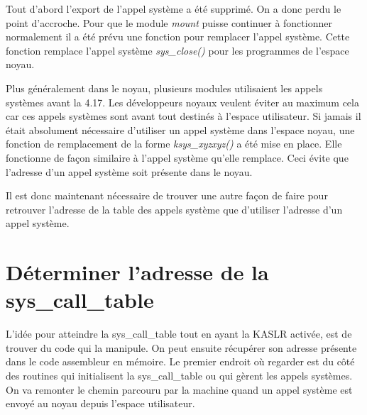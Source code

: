 \documentclass[journal, a4paper]{IEEEtran}
\begin{document}
Tout d'abord l'export de l'appel système a été supprimé. On a donc perdu le point d'accroche. Pour que le module \textit{mount} puisse continuer à fonctionner normalement il a été prévu une fonction pour remplacer l'appel système. Cette fonction remplace l'appel système \textit{sys\_close()} pour les programmes de l'espace noyau.

 Plus généralement dans le noyau, plusieurs modules utilisaient les appels systèmes avant la 4.17. Les développeurs noyaux veulent éviter au maximum cela car ces appels systèmes sont avant tout destinés à l'espace utilisateur. Si jamais il était absolument nécessaire d'utiliser un appel système dans l'espace noyau, une fonction de remplacement de la forme \textit{ksys\_xyzxyz()} a été mise en place. Elle fonctionne de façon similaire à l'appel système qu'elle remplace. Ceci évite que l'adresse d'un appel système soit présente dans le noyau.

Il est donc maintenant nécessaire de trouver une autre façon de faire pour retrouver l'adresse de la table des appels système que d'utiliser l'adresse d'un appel système.

\section{Déterminer l'adresse de la sys\_call\_table}

L'idée pour atteindre la sys\_call\_table tout en ayant la KASLR activée, est de trouver du code qui la manipule. On peut ensuite récupérer son adresse présente dans le code assembleur en mémoire. Le premier endroit où regarder est du côté des routines qui initialisent la sys\_call\_table ou qui gèrent les appels systèmes. On va remonter le chemin parcouru par la machine quand un appel système est envoyé au noyau depuis l'espace utilisateur.
\end{document}

